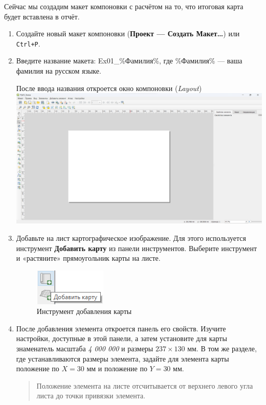 \documentclass[
  12pt,
]{book}
\begin{document}
Сейчас мы создадим макет компоновки с расчётом на то, что итоговая карта будет вставлена в отчёт.

\begin{enumerate}
\def\labelenumi{\arabic{enumi}.}
\item
  Создайте новый макет компоновки (\textbf{Проект --- Создать Макет\ldots{}}) или \texttt{Ctrl+P}.
\item
  Введите название макета: Ex01\_\%Фамилия\%, где \%Фамилия\% --- ваша фамилия на русском языке.

  После ввода названия откроется окно компоновки (\emph{Layout})\\
  \includegraphics{images/Ex01_MapGeneral/Layout.png}
\item
  Добавьте на лист картографическое изображение. Для этого используется инструмент \textbf{Добавить карту} из панели инструментов. Выберите инструмент и «растяните» прямоугольник карты на листе.

  \begin{figure}
  \centering
  \includegraphics{images/Ex01_MapGeneral/button_AddMap.png}
  \caption{Инструмент добавления карты}
  \end{figure}
\item
  После добавления элемента откроется панель его свойств. Изучите настройки, доступные в этой панели, а затем установите для карты знаменатель масштаба \emph{4 000 000} и размеры \(237\times130\) мм. В том же разделе, где устанавливаются размеры элемента, задайте для элемента карты положение по \(X = 30\) мм и положение по \(Y = 30\) мм.

  \begin{quote}
  Положение элемента на листе отсчитывается от верхнего левого угла листа до точки привязки элемента.
  \end{quote}


\end{enumerate}
\end{document}

